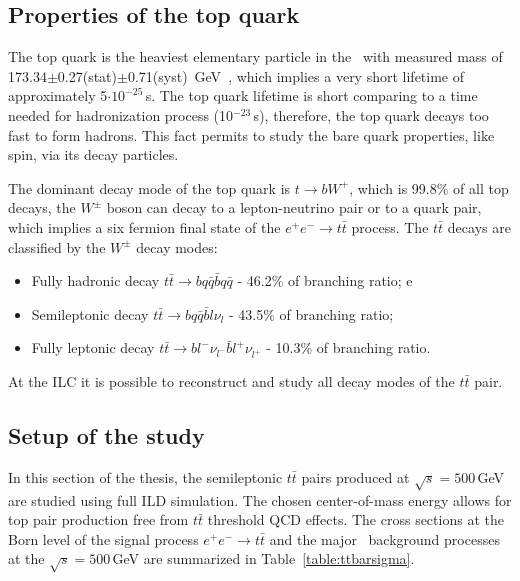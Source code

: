 \subsection{Properties of the top quark}

The top quark is the heaviest elementary particle in the \sm\ with measured mass of 173.34$\pm$0.27(stat)$\pm$0.71(syst) \,GeV~\cite{bib:TopMass}, which implies a very short lifetime of approximately 5$\cdot10^{-25}$\,s.
The top quark lifetime is short comparing to a time needed for hadronization process  (10$^{-23}$\,s), therefore, the top quark decays too fast to form hadrons. 
This fact permits to study the bare quark properties, like spin, via its decay particles. 

The dominant decay mode of the top quark is $t\to bW^+$, which is 99.8\% of all top decays, the $W^\pm$ boson can decay to a lepton-neutrino pair or to a quark pair, which implies a six fermion final state of the $e^+e^-\to t\bar{t}$ process.
The $t\bar{t}$  decays are classified by the $W^\pm$ decay modes:
\begin{itemize}
	\item Fully hadronic decay $t\bar{t} \to bq\bar{q} \bar{b} q\bar{q}$ -  46.2\% of branching ratio;
e	\item Semileptonic decay $t\bar{t} \to bq\bar{q} \bar{b} l\nu_l$ - 43.5\% of branching ratio;
	\item Fully leptonic decay $t\bar{t} \to b l^- \nu_{l^-} \bar{b} l^+\nu_{l^+}$ - 10.3\% of branching ratio.	
\end{itemize}


At the ILC it is possible to reconstruct and study all decay modes of the $t\bar{t}$ pair.
\subsection{Setup of the study}
In this section of the thesis, the semileptonic $t\bar{t}$ pairs produced at $\sqrt{s}=500$\,GeV are studied using full ILD simulation.
The chosen center-of-mass energy allows for top pair production free from $t\bar{t}$ threshold QCD effects.
The cross sections at the Born level of the signal process $e^+e^- \to t\bar{t}$ and the major \small\ background processes at the $\sqrt{s} = 500$\,GeV are summarized in Table~\ref{table:ttbarsigma}.

